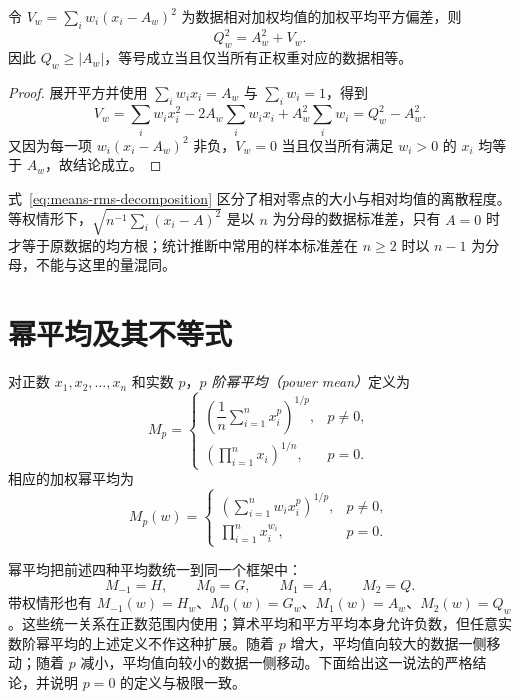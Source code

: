 \documentclass[UTF8,12pt,a4paper,fontset=fandol]{ctexart}
\begin{document}
\begin{proposition}
\label{prop:means-rms-decomposition}
令 $V_w=\sum_iw_i(x_i-A_w)^2$ 为数据相对加权均值的加权平均平方偏差，则
\begin{equation}
\label{eq:means-rms-decomposition}
  Q_w^2=A_w^2+V_w.
\end{equation}
因此 $Q_w\ge|A_w|$，等号成立当且仅当所有正权重对应的数据相等。
\end{proposition}

\begin{proof}
展开平方并使用 $\sum_iw_ix_i=A_w$ 与 $\sum_iw_i=1$，得到
\[
  V_w=\sum_iw_ix_i^2-2A_w\sum_iw_ix_i+A_w^2\sum_iw_i
  =Q_w^2-A_w^2.
\]
又因为每一项 $w_i(x_i-A_w)^2$ 非负，$V_w=0$ 当且仅当所有满足 $w_i>0$ 的 $x_i$ 均等于 $A_w$，故结论成立。
\end{proof}

式~\eqref{eq:means-rms-decomposition} 区分了相对零点的大小与相对均值的离散程度。等权情形下，$\sqrt{n^{-1}\sum_i(x_i-A)^2}$ 是以 $n$ 为分母的数据标准差，只有 $A=0$ 时才等于原数据的均方根；统计推断中常用的样本标准差在 $n\ge2$ 时以 $n-1$ 为分母，不能与这里的量混同。

\section{幂平均及其不等式}
\label{sec:means-power}

\begin{definition}
对正数 $x_1,x_2,\ldots,x_n$ 和实数 $p$，\emph{$p$ 阶幂平均（power mean）}定义为
\begin{equation}
\label{eq:means-power}
  M_p=
  \begin{cases}
    \left(\dfrac{1}{n}\sum_{i=1}^n x_i^p\right)^{1/p}, & p\ne0,\\[1.2em]
    \left(\prod_{i=1}^n x_i\right)^{1/n}, & p=0.
  \end{cases}
\end{equation}
相应的加权幂平均为
\begin{equation}
\label{eq:means-weighted-power}
  M_p(w)=
  \begin{cases}
    \left(\displaystyle\sum_{i=1}^n w_i x_i^p\right)^{1/p}, & p\ne0,\\[1.2em]
    \displaystyle\prod_{i=1}^n x_i^{w_i}, & p=0.
  \end{cases}
\end{equation}
\end{definition}

幂平均把前述四种平均数统一到同一个框架中：
\begin{equation}
\label{eq:means-power-special-cases}
  M_{-1}=H,\qquad M_0=G,\qquad M_1=A,\qquad M_2=Q.
\end{equation}
带权情形也有 $M_{-1}(w)=H_w$、$M_0(w)=G_w$、$M_1(w)=A_w$、$M_2(w)=Q_w$。这些统一关系在正数范围内使用；算术平均和平方平均本身允许负数，但任意实数阶幂平均的上述定义不作这种扩展。随着 $p$ 增大，平均值向较大的数据一侧移动；随着 $p$ 减小，平均值向较小的数据一侧移动。下面给出这一说法的严格结论，并说明 $p=0$ 的定义与极限一致。
\end{document}
